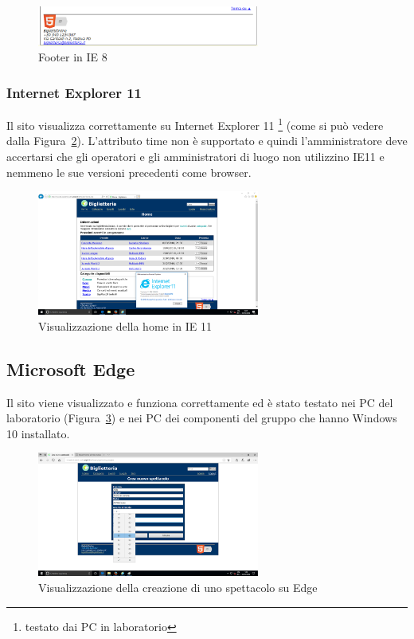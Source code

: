 \documentclass[10pt, a4paper]{article}
\begin{document}
\begin{figure}[h!]
	\centering
	\includegraphics[width=0.65\textwidth]{Images/footer_IE.png}
	\caption{Footer in IE 8}
	\label{fig:footer_IE}
\end{figure}

\subsubsection{Internet Explorer 11}
Il sito visualizza correttamente su Internet Explorer 11 \footnote{testato dai PC in laboratorio} (come si può vedere dalla Figura~\ref{fig:IE_11}).
L'attributo time non è supportato e quindi l'amministratore deve accertarsi che gli operatori e gli amministratori di luogo 
non utilizzino IE11 e nemmeno le sue versioni precedenti come browser.
\begin{figure}[h!]
	\centering
	\includegraphics[width=0.65\textwidth]{Images/IE_11.png}
	\caption{Visualizzazione della home in IE 11}
	\label{fig:IE_11}
\end{figure}

\subsection{Microsoft Edge}
Il sito viene visualizzato e funziona correttamente ed è stato testato nei PC del laboratorio 
(Figura~\ref{fig:edge}) e nei PC dei componenti del gruppo che hanno Windows 10 installato.
\begin{figure}[h!]
	\centering
	\includegraphics[width=0.65\textwidth]{Images/edge.png}
	\caption{Visualizzazione della creazione di uno spettacolo su Edge}
	\label{fig:edge}
\end{figure}
\end{document}

